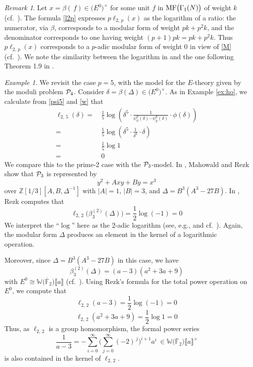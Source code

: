 \documentclass{gtpart}
\theoremstyle{definition}
\theoremstyle{remark}
\newtheorem{rmk}[equation]{Remark}
\newtheorem{ex}[equation]{Example}
\newcommand{\mb}[1]{\mathbb{#1}}
\newcommand{\cF}{\overline {\mb F}}
\newcommand{\CP}{{\cal P}}
\newcommand{\BW}{{\mb W}}
\newcommand{\BZ}{{\mb Z}}
\newcommand{\MF}{{\rm MF}}
\newcommand{\B}{\beta}
\renewcommand{\D}{\Delta}
\renewcommand{\d}{\delta}
\newcommand{\G}{\Gamma}
\newcommand{\lb}{\llbracket}
\newcommand{\rb}{\rrbracket}
\renewcommand{\=}{\approx}
\renewcommand{\-}{\sim}
\numberwithin{equation}{section}
\begin{document}
\begin{rmk}
 \label{rmk:ratio}
 Let $x = \B(\,f) \in \big( E^0 \big)^{\!\times}$ for some unit $f$ in 
 $\MF\big(\G_1(N)\big)$ of weight $k$ (cf.~\cite{KubertLang}).  The formula 
 \eqref{l2p} expresses $p \ell_{2,\,p}(x)$ as the logarithm of a ratio: the 
 numerator, via $\B$, corresponds to a modular form of weight $p k + p^2 k$, and 
 the denominator corresponds to one having weight $(p + 1) p k = p k + p^2 k$.  
 Thus $p \ell_{2,\,p}(x)$ corresponds to a $p$-adic modular form of weight 0 in 
 view of \eqref{M} (cf.~\cite[Section 10.1]{padicinterp}).  We note the 
 similarity between the logarithm in \cite[10.2.7]{padicinterp} and the one 
 following Theorem 1.9 in \cite{log}.  
\end{rmk}

\begin{ex}
 \label{ex:log}
 We revisit the case $p = 5$, with the model for the $E$-theory given by the 
 moduli problem $\CP_4$.  Consider $\d = \B(\D) \in \big( E^0 \big)^{\!\times}$.  
 As in Example \ref{ex:ho}, we calculate from \eqref{psi5} and \eqref{w} that 
 \begin{equation*}
  \begin{split}
   \ell_{2,\,5}(\d) = & ~ \frac{1}{5} \log \left( \d^5 \cdot 
                        \frac{1}{\psi^p_0(\d) \cdots \psi^p_p(\d)} \cdot 
                        \phi(\d) \right) \\
                    = & ~ \frac{1}{5} \log \left( \d^5 \cdot \frac{1}{\d^6} 
                        \cdot \d \right) \\
                    = & ~ \frac{1}{5} \log 1 \\
                    = & ~ 0 
  \end{split}
 \end{equation*}
 We compare this to the prime-2 case with the $\CP_3$-model.  In 
 \cite[Proposition 3.2]{tmf3}, Mahowald and Rezk show that $\CP_3$ is 
 represented by 
 \[
  y^2 + A x y + B y = x^3 
 \]
 over $\BZ[1/3][A, B, \D^{-1}]$ with $|A| = 1$, $|B| = 3$, and 
 $\D = B^3 (A^3 - 27 B)$.  In \cite[2.8]{h2p2}, Rezk computes that 
 \[
  \ell_{2,\,2}\big(\B_3^{(2)}(\D)\big) = \frac{1}{2} \log(-1) = 0 
 \]
 We interpret the ``$\log$'' here as the 2-adic logarithm (see, e.g., 
 \cite[\S IV.1]{padic} and cf.~\cite[10.2.16]{padicinterp}).  Again, the modular 
 form $\D$ produces an element in the kernel of a logarithmic operation.  

 Moreover, since $\D = B^3 (A^3 - 27 B)$ in this case, we have 
 \[
  \B_3^{(2)}(\D) = (a - 3) (a^2 + 3 a + 9) 
 \]
 with $E^0 \cong \BW \big( \cF_2 \big) \lb a \rb$ (cf.~\cite[Section 4]{h2p2}).  
 Using Rezk's formula for the total power operation on $E^0$, we compute that 
 \[
  \ell_{2,\,2}(a - 3) = \frac{1}{2} \log(-1) = 0 
 \]
 \[
  \ell_{2,\,2}(a^2 + 3 a + 9) = \frac{1}{2} \log 1 = 0 
 \]
 Thus, as $\ell_{2,\,2}$ is a group homomorphism, the formal power series 
 \[
  \frac{1}{a - 3} = -\sum_{i = 0}^\infty 
                    \Big( \sum_{j = 0}^\infty (-2)^{\,j} \Big)^{\!i + 1} a^i ~ 
                    \in \BW \big( \cF_2 \big) \lb a \rb^\times 
 \]
 is also contained in the kernel of $\ell_{2,\,2}$.  


\end{ex}
\end{document}
